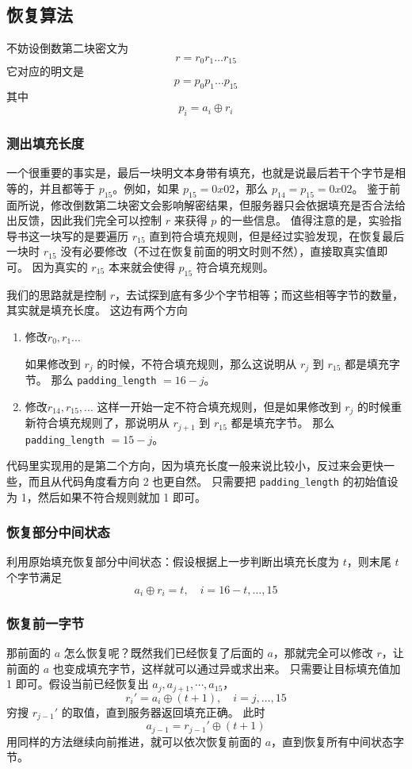 \subsection{恢复算法}
不妨设倒数第二块密文为
\[
r = r_0r_1\ldots r_{15}
\]
它对应的明文是
\[
p = p_0p_1\ldots p_{15}
\]
其中
\[
p_i = a_i \oplus r_i
\]
\subsubsection{测出填充长度}
    一个很重要的事实是，最后一块明文本身带有填充，也就是说最后若干个字节是相等的，并且都等于 \(p_{15}\)。例如，如果 \(p_{15}=0x02\)，那么 \(p_{14}=p_{15}=0x02\)。
鉴于前面所说，修改倒数第二块密文会影响解密结果，但服务器只会依据填充是否合法给出反馈，因此我们完全可以控制 \(r\) 来获得 \(p\) 的一些信息。
值得注意的是，实验指导书这一块写的是要遍历 \(r_{15}\) 直到符合填充规则，但是经过实验发现，在恢复最后一块时 \(r_{15}\) 没有必要修改（不过在恢复前面的明文时则不然），直接取真实值即可。
因为真实的 \(r_{15}\) 本来就会使得 \(p_{15}\) 符合填充规则。

我们的思路就是控制 \(r\)，去试探到底有多少个字节相等；而这些相等字节的数量，其实就是填充长度。
这边有两个方向
\begin{enumerate}

\item 修改\(r_{0},r_{1}...\)

如果修改到 \(r_j\) 的时候，不符合填充规则，那么这说明从 \(r_j\) 到 \(r_{15}\) 都是填充字节。
那么 \verb|padding_length| \(= 16 - j\)。

\item 修改\(r_{14},r_{15},...\)
这样一开始一定不符合填充规则，但是如果修改到 \(r_j\) 的时候重新符合填充规则了，那说明从 \(r_{j+1}\) 到 \(r_{15}\) 都是填充字节。
那么 \verb|padding_length| \(= 15 - j\)。
\end{enumerate}
代码里实现用的是第二个方向，因为填充长度一般来说比较小，反过来会更快一些，而且从代码角度看方向 2 也更自然。
只需要把 \verb|padding_length| 的初始值设为 1，然后如果不符合规则就加 1 即可。
\subsubsection{恢复部分中间状态}
利用原始填充恢复部分中间状态：假设根据上一步判断出填充长度为 $t$，则末尾 $t$ 个字节满足
\[
    a_i \oplus r_i = t,\quad i = 16-t,\ldots,15
\]
\subsubsection{恢复前一字节}
那前面的 \(a\) 怎么恢复呢？既然我们已经恢复了后面的 \(a\)，那就完全可以修改 \(r\)，让前面的 \(a\) 也变成填充字节，这样就可以通过异或求出来。
只需要让目标填充值加 1 即可。假设当前已经恢复出 $a_j,a_{j+1},\cdots,a_{15}$，
\[
    r_i' = a_i \oplus (t+1),\quad i = j,\ldots,15
\]
穷搜 $r_{j-1}'$ 的取值，直到服务器返回填充正确。
此时
\[
    a_{j-1} = r_{j-1}' \oplus (t+1)
\]
用同样的方法继续向前推进，就可以依次恢复前面的 \(a\)，直到恢复所有中间状态字节。
